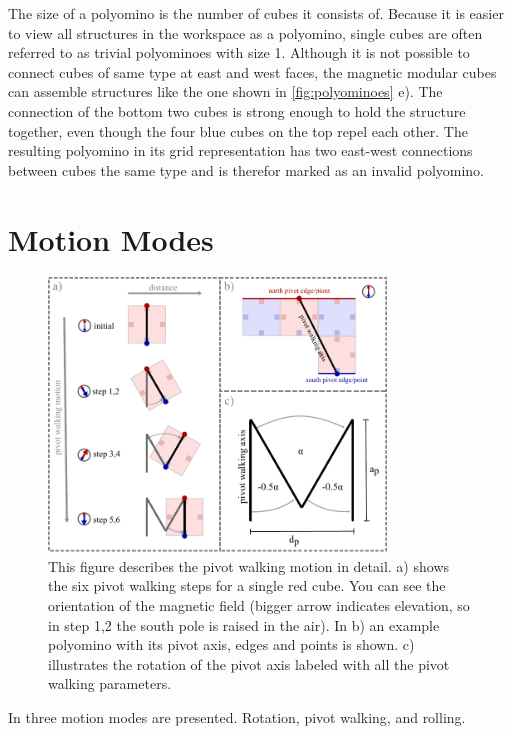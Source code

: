 The size of a polyomino is the number of cubes it consists of.
Because it is easier to view all structures in the workspace as a polyomino, single cubes are often referred to as trivial polyominoes with size 1.
Although it is not possible to connect cubes of same type at east and west faces, the magnetic modular cubes can assemble structures like the one shown in \autoref{fig:polyominoes} e).
The connection of the bottom two cubes is strong enough to hold the structure together, even though the four blue cubes on the top repel each other.
The resulting polyomino in its grid representation has two east-west connections between cubes the same type and is therefor marked as an invalid polyomino.


\section{Motion Modes}
\label{sec:motion}

\begin{figure}
	\centering
	\includegraphics[width=0.80\textwidth]{figures/pivot_walking.pdf}
	\caption[Illustration of the pivot walking motion]{This figure describes the pivot walking motion in detail. a) shows the six pivot walking steps for a single red cube. You can see the orientation of the magnetic field (bigger arrow indicates elevation, so in step 1,2 the south pole is raised in the air). In b) an example polyomino with its pivot axis, edges and points is shown. c) illustrates the rotation of the pivot axis labeled with all the pivot walking parameters.}
	\label{fig:pivot_walking}
\end{figure}

In \cite{Bhattacharjee2022} three motion modes are presented. Rotation, pivot walking, and rolling.

